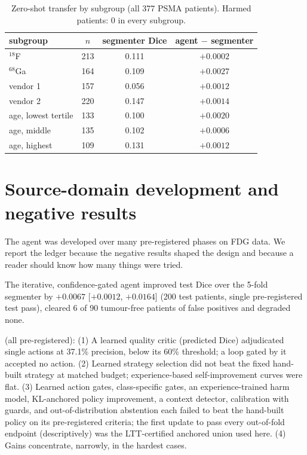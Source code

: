 \begin{table}[h]
\centering
\caption{Zero-shot transfer by subgroup (all 377 PSMA patients). Harmed patients: 0 in every subgroup.}
\label{tab:supp_subgroups}
\footnotesize
\begin{tabular}{@{}lccc@{}}
\toprule
subgroup & $n$ & segmenter Dice & agent $-$ segmenter \\
\midrule
$^{18}$F & 213 & 0.111 & $+0.0002$ \\
$^{68}$Ga & 164 & 0.109 & $+0.0027$ \\
vendor 1 & 157 & 0.056 & $+0.0012$ \\
vendor 2 & 220 & 0.147 & $+0.0014$ \\
age, lowest tertile & 133 & 0.100 & $+0.0020$ \\
age, middle & 135 & 0.102 & $+0.0006$ \\
age, highest & 109 & 0.131 & $+0.0012$ \\
\bottomrule
\end{tabular}
\end{table}

\section{Source-domain development and negative results}
\label{sec:supp_fdg}

The agent was developed over many pre-registered phases on FDG data. We report the ledger because the negative results shaped the design and because a reader should know how many things were tried.

 The iterative, confidence-gated agent improved test Dice over the 5-fold segmenter by $+0.0067$ [$+0.0012$, $+0.0164$] (200 test patients, single pre-registered test pass), cleared 6 of 90 tumour-free patients of false positives and degraded none.

 (all pre-registered):
(1) A learned quality critic (predicted Dice) adjudicated single actions at 37.1\% precision, below its 60\% threshold; a loop gated by it accepted no action.
(2) Learned strategy selection did not beat the fixed hand-built strategy at matched budget; experience-based self-improvement curves were flat.
(3) Learned action gates, class-specific gates, an experience-trained harm model, KL-anchored policy improvement, a context detector, calibration with guards, and out-of-distribution abstention each failed to beat the hand-built policy on its pre-registered criteria; the first update to pass every out-of-fold endpoint (descriptively) was the LTT-certified anchored union used here.
(4) Gains concentrate, narrowly, in the hardest cases.

